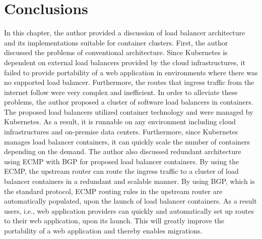 \section{Conclusions}\label{Conclusions}


In this chapter, the author provided a discussion of load balancer architecture and its implementations suitable for container clusters.
%                                                                                                                                                            
First, the author discussed the problems of conventional architecture.
Since Kubernetes is dependent on external load balancers provided by the cloud infrastructures,
it failed to provide portability of a web application in environments where there was no supported load balancer.
Furthermore, the routes that ingress traffic from the internet follow were very complex and inefficient.
In order to alleviate these problems, the author proposed a cluster of software load balancers in containers.
The proposed load balancers utilized container technology and were managed by Kubernetes.
As a result, it is runnable on any environment including cloud infrastructures and on-premise data centers.
Furthermore, since Kubernetes manages load balancer containers, it can quickly scale the number of containers depending on the demand.
%                                                                                                                                                            
The author also discussed redundant architecture using ECMP with BGP for proposed load balancer containers.
By using the ECMP, the upstream router can route the ingress traffic to a cluster of load balancer containers in a redundant and scalable manner.
By using BGP, which is the standard protocol, ECMP routing rules in the upstream router are automatically populated, upon the launch of load balancer containers.
As a result users, i.e., web application providers can quickly and automatically set up routes to their web application, upon its launch.
This will greatly improve the portability of a web application and thereby enables migrations.


